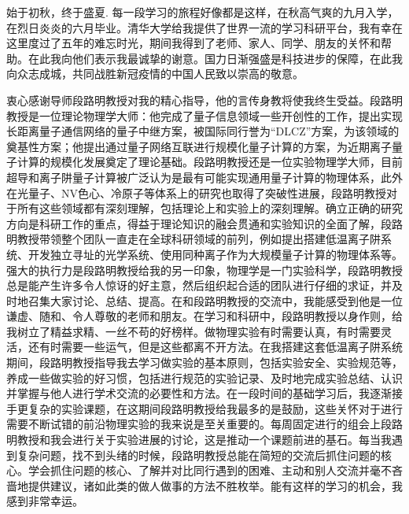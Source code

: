 
\begin{acknowledgements}
  始于初秋，终于盛夏. 每一段学习的旅程好像都是这样，在秋高气爽的九月入学，在烈日炎炎的六月毕业。清华大学给我提供了世界一流的学习科研平台，我有幸在这里度过了五年的难忘时光，期间我得到了老师、家人、同学、朋友的关怀和帮助。在此我向他们表示我最诚挚的谢意。国力日渐强盛是科技进步的保障，在此我向众志成城，共同战胜新冠疫情的中国人民致以崇高的敬意。

  衷心感谢导师段路明教授对我的精心指导，他的言传身教将使我终生受益。段路明教授是一位理论物理学大师：他完成了量子信息领域一些开创性的工作，提出实现长距离量子通信网络的量子中继方案，被国际同行誉为“DLCZ”方案，为该领域的奠基性方案；他提出通过量子网络互联进行规模化量子计算的方案，为近期离子量子计算的规模化发展奠定了理论基础。段路明教授还是一位实验物理学大师，目前超导和离子阱量子计算被广泛认为是最有可能实现通用量子计算的物理体系，此外在光量子、NV色心、冷原子等体系上的研究也取得了突破性进展，段路明教授对于所有这些领域都有深刻理解，包括理论上和实验上的深刻理解。确立正确的研究方向是科研工作的重点，得益于理论知识的融会贯通和实验知识的全面了解，段路明教授带领整个团队一直走在全球科研领域的前列，例如提出搭建低温离子阱系统、开发独立寻址的光学系统、使用同种离子作为大规模量子计算的物理体系等。强大的执行力是段路明教授给我的另一印象，物理学是一门实验科学，段路明教授总是能产生许多令人惊讶的好主意，然后组织起合适的团队进行仔细的求证，并及时地召集大家讨论、总结、提高。在和段路明教授的交流中，我能感受到他是一位谦虚、随和、令人尊敬的老师和朋友。在学习和科研中，段路明教授以身作则，给我树立了精益求精、一丝不苟的好榜样。做物理实验有时需要认真，有时需要灵活，还有时需要一些运气，但是这些都离不开方法。在我搭建这套低温离子阱系统期间，段路明教授指导我去学习做实验的基本原则，包括实验安全、实验规范等，养成一些做实验的好习惯，包括进行规范的实验记录、及时地完成实验总结、认识并掌握与他人进行学术交流的必要性和方法。在一段时间的基础学习后，我逐渐接手更复杂的实验课题，在这期间段路明教授给我最多的是鼓励，这些关怀对于进行需要不断试错的前沿物理实验的我来说是至关重要的。每周固定进行的组会上段路明教授和我会进行关于实验进展的讨论，这是推动一个课题前进的基石。每当我遇到复杂问题，找不到头绪的时候，段路明教授总能在简短的交流后抓住问题的核心。学会抓住问题的核心、了解并对比同行遇到的困难、主动和别人交流并毫不吝啬地提供建议，诸如此类的做人做事的方法不胜枚举。能有这样的学习的机会，我感到非常幸运。


\end{acknowledgements}
